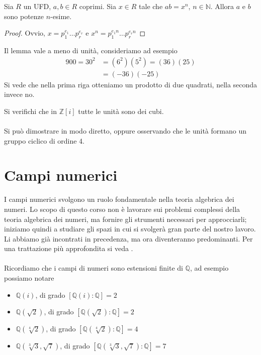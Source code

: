 \begin{lemma}
	Sia $R$ un UFD, $a,b\in R$ coprimi. Sia $x\in R$ tale che $ab=x^n$, $n\in\mathbb{N}$. Allora $a$ e $b$ sono potenze $n$-esime.
\end{lemma}
\begin{proof}
	Ovvio, $x=p_1^{e_1}\dots p_r^{e_r}$ e $x^n=p_1^{e_1n}\dots p_r^{e_rn}$
\end{proof}
\begin{osservazione}
	Il lemma vale a meno di unità, consideriamo ad esempio
	\begin{align*}
	900=30^2&=(6^2)(5^2)=(36)(25)\\
	&=(-36)(-25)
	\end{align*}
	Si vede che nella prima riga otteniamo un prodotto di due quadrati, nella seconda invece no.
\end{osservazione}
\begin{esercizio}
	Si verifichi che in $\mathbb{Z}[i]$ tutte le unità sono dei cubi. \\ \\ Si può dimostrare in modo diretto, oppure osservando che le unità formano un gruppo ciclico di ordine 4.
\end{esercizio}




\chapter{Campi numerici}
I campi numerici svolgono un ruolo fondamentale nella teoria algebrica dei numeri. Lo scopo di questo corso non è lavorare sui problemi complessi della teoria algebrica dei numeri, ma fornire gli strumenti necessari per approcciarli; iniziamo quindi a studiare gli spazi in cui si svolgerà gran parte del nostro lavoro. Li abbiamo già incontrati in precedenza, ma ora diventeranno predominanti. Per una trattazione più approfondita si veda \cite[Capitolo~2]{milneANT}. \\ \\
Ricordiamo che i campi di numeri sono estensioni finite di $\mathbb{Q}$, ad esempio possiamo notare
\begin{itemize}
	\item $\mathbb{Q}(i)$, di grado $[\mathbb{Q}(i):\mathbb{Q}]=2$
	\item $\mathbb{Q}(\sqrt{2})$, di grado $[\mathbb{Q}(\sqrt{2}):\mathbb{Q}]=2$
	\item $\mathbb{Q}(\sqrt[4]{2})$, di grado $[\mathbb{Q}(\sqrt[4]{2}):\mathbb{Q}]=4$
	\item $\mathbb{Q}(\sqrt[3]{3},\sqrt{7})$, di grado $[\mathbb{Q}(\sqrt[3]{3},\sqrt{7}):\mathbb{Q}]=7$
\end{itemize}




